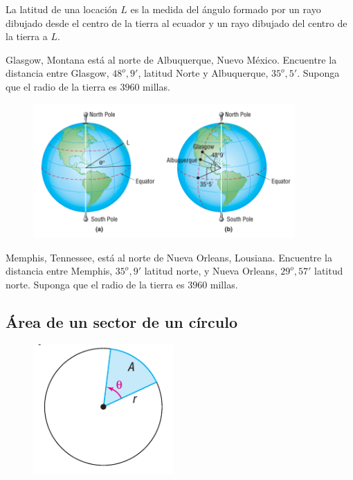 {}
	\begin{problema}
		La latitud de una locación $L$ es la medida del ángulo formado por un rayo dibujado desde el centro de la tierra al ecuador y un rayo dibujado del centro de la tierra a $L$. 
		
		Glasgow, Montana está al norte de Albuquerque, Nuevo México. Encuentre la distancia entre Glasgow, $48^{o}, 9'$, latitud Norte y Albuquerque, $35^{o}, 5'$. Suponga que el radio de la tierra es $3960$ millas.
	\end{problema}
	

{}
	\begin{figure}[h]
		\centering
		\includegraphics[width=10cm,keepaspectratio=true]{./trig/sull113.png}
		\label{fig:sull6113}
	\end{figure}
	

{}
	\begin{problema}
		Memphis, Tennessee, está al norte de Nueva Orleans, Lousiana. Encuentre la distancia entre Memphis, $35^{o}, 9'$ latitud norte, y Nueva Orleans, $29^{o}, 57'$ latitud norte. Suponga que el radio de la tierra es $3960$ millas. 
	\end{problema}
	

\subsection{Área de un sector de un círculo} 
{}
	\begin{figure}[h]
		\centering
		\includegraphics[height=5cm,keepaspectratio=true]{./trig/sull614.png}
		\label{fig:sull6114}
	\end{figure}

